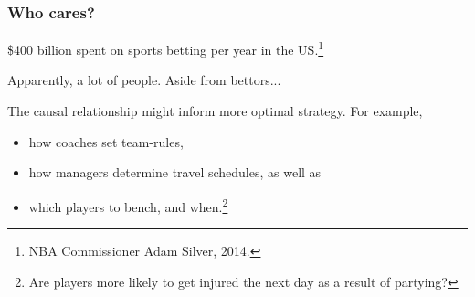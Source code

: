\documentclass{beamer}
\begin{document}



\begin{frame}   
  \frametitle{Who cares?}
  \begin{block}{\$400 billion spent on sports betting per year in the US.\footnote{NBA Commissioner Adam Silver, 2014.}}

    Apparently, a lot of people. Aside from bettors...
  \end{block}

  \vspace{12pt}\begin{block}{The causal relationship might inform more optimal strategy.}     For example,
    \begin{itemize}       
      \item how coaches set team-rules, 
      \item how managers determine travel schedules, as well as
      \item which players to bench, and when.\footnote{Are players more likely to get injured the next day as a result of partying?}
    \end{itemize}
  \end{block}
\end{frame}





\end{document}
